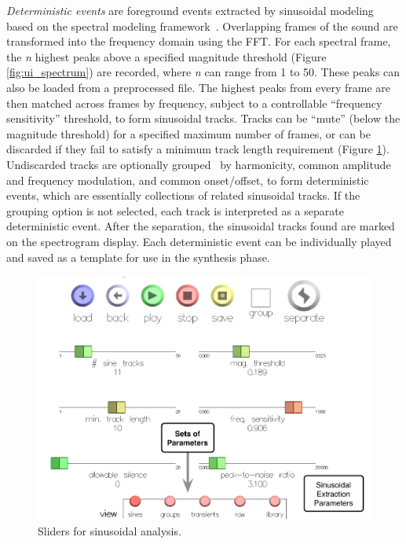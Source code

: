 \documentclass[10pt,letterpaper]{article}
\begin{document}
\textit{Deterministic events} are foreground events extracted by
sinusoidal modeling based on the spectral modeling
framework~\cite{Serra89}. Overlapping frames of the sound are
transformed into the frequency domain using the FFT. For each spectral
frame, the \textit{n} highest peaks above a specified magnitude
threshold (Figure \ref{fig:ui_spectrum}) are recorded, where \textit{n}
can range from 1 to 50. These peaks can also be loaded from a
preprocessed file. The highest peaks from every frame are then matched
across frames by frequency, subject to a controllable ``frequency
sensitivity'' threshold, to form sinusoidal tracks. Tracks can be
``mute'' (below the magnitude threshold) for a specified maximum number
of frames, or can be discarded if they fail to satisfy a minimum track
length requirement (Figure \ref{fig:ui_sines}). Undiscarded tracks are optionally group\-ed~\cite{Ellis94,Melih00} by harmonicity, common amplitude and frequency modulation, and common onset/offset, to form deterministic
events, which are essentially collections of related sinusoidal tracks.
If the grouping option is not selected, each track is interpreted as a
separate deterministic event. After the separation, the sinusoidal
tracks found are marked on the spectrogram display. Each deterministic
event can be individually played and saved as a template for use in the
synthesis phase. 

\begin{figure}[!h]
  \begin{center}
    \includegraphics[width=1\columnwidth]{ui_sliders1_w.pdf}
    \caption{Sliders for sinusoidal analysis.} 
    \label{fig:ui_sines}
  \end{center}
\end{figure}
\end{document}
